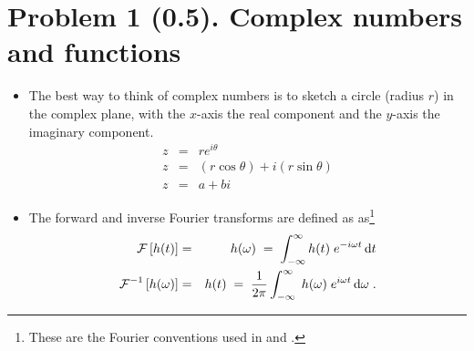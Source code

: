 \documentclass[11pt,titlepage,fleqn]{article}
\newcommand{\fft}{h}
\begin{document}

\pagebreak
\section*{Problem 1 (0.5). Complex numbers and functions}

\begin{itemize}
\item The best way to think of complex numbers is to sketch a circle (radius $r$) in the complex plane, with the $x$-axis the real component and the $y$-axis the imaginary component.
%
\begin{eqnarray*}
z &=& r e^{i\theta}
\\
z &=& (r\cos\theta) + i(r\sin\theta)
\\
z &=& a + bi
\end{eqnarray*}



\item The forward and inverse Fourier transforms are defined as as\footnote{These are the Fourier conventions used in \citet[][p.~109]{DT} and \citet[][Section 6.4.2]{SteinWysession}.}
%
\begin{eqnarray}
\cF \left[ \fft(t) \right] &=& \fft(\omega)
\;=\; \int_{-\infty}^{\infty} \fft(t) \; e^{-i\omega t} \,\rmd t
\label{fft}
\\
\cF^{-1} \left[ \fft(\omega) \right] &=& \fft(t) 
\;=\; \frac{1}{2\pi} \int_{-\infty}^{\infty} \; \fft(\omega) \; e^{i\omega t} \,\rmd\omega 
\label{ifft}
\;.
\end{eqnarray}

\end{itemize}
\end{document}
